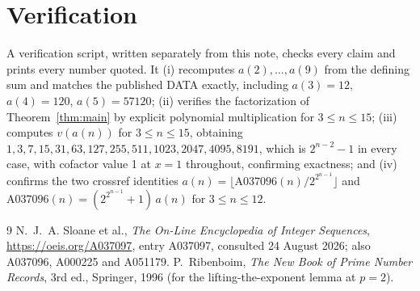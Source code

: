 \documentclass[11pt,a4paper]{article}
\theoremstyle{plain}
\theoremstyle{definition}
\begin{document}
\section{Verification}

A verification script, written separately from this note, checks every claim and prints
every number quoted. It (i) recomputes $a(2),\dots,a(9)$ from the defining sum and matches
the published DATA exactly, including $a(3)=12$, $a(4)=120$, $a(5)=57120$; (ii) verifies the
factorization of Theorem~\ref{thm:main} by explicit polynomial multiplication for
$3\le n\le15$; (iii) computes $v(a(n))$ for $3\le n\le15$, obtaining
$1,3,7,15,31,63,127,255,511,1023,2047,4095,8191$, which is $2^{n-2}-1$ in every case, with
cofactor value 1 at $x=1$ throughout, confirming exactness; and (iv) confirms the two
crossref identities $a(n)=\lfloor \mathrm{A037096}(n)/2^{2^{n-1}}\rfloor$ and
$\mathrm{A037096}(n)=(2^{2^{n-1}}+1)\,a(n)$ for $3\le n\le12$.

\begin{thebibliography}{9}
 N.~J.~A. Sloane et al., \emph{The On-Line Encyclopedia of Integer
Sequences}, \url{https://oeis.org/A037097}, entry A037097, consulted 24 August 2026; also
A037096, A000225 and A051179.
 P.~Ribenboim, \emph{The New Book of Prime Number Records}, 3rd ed.,
Springer, 1996 (for the lifting-the-exponent lemma at $p=2$).
\end{thebibliography}
\end{document}
